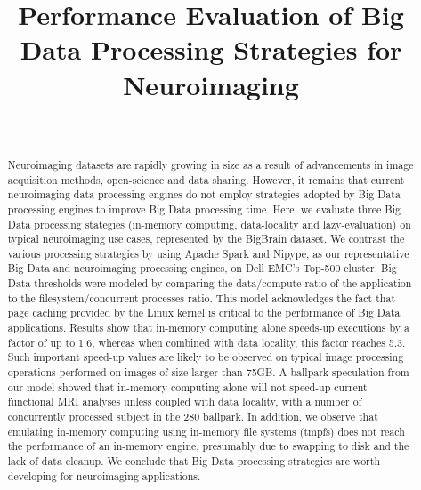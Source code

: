 \documentclass{IEEEtran}
\begin{document}
\title{Performance Evaluation of Big Data Processing Strategies for Neuroimaging}

\author{
  \\
}

\maketitle

\begin{abstract}
    Neuroimaging datasets are rapidly growing in size as a result of 
    advancements in image acquisition methods, open-science and data sharing. 
    However, it remains that current neuroimaging data processing engines do 
    not employ strategies adopted by Big Data processing engines to improve 
    Big Data processing time. Here, we 
    evaluate three Big Data processing stategies (in-memory computing, 
    data-locality and lazy-evaluation) on typical neuroimaging use 
    cases, represented by the BigBrain dataset. We contrast the various 
    processing strategies by using Apache Spark and Nipype, as our 
    representative Big Data and neuroimaging processing engines, on Dell EMC's 
    Top-500 cluster. 
    Big Data thresholds were modeled by comparing the data/compute ratio of the 
    application to the filesystem/concurrent processes ratio. 
    This model acknowledges the 
fact that page caching provided by the Linux kernel is critical to the 
performance of Big Data applications. Results show that in-memory 
computing alone speeds-up executions by a factor of up to 1.6, whereas 
when combined with data locality, this factor reaches 5.3. Such important 
speed-up values are likely to be observed on typical image processing 
operations performed on images of size larger than 75GB. A ballpark 
speculation from our model showed that in-memory computing alone will
not speed-up current 
functional MRI analyses unless coupled with data 
locality, with a number of concurrently processed subject in the  280 ballpark. 
    In addition, we observe that emulating in-memory computing 
using in-memory file systems (tmpfs) does not reach the performance of 
an in-memory engine, presumably due to swapping to disk and the lack of data cleanup.
We conclude that Big Data processing strategies are 
worth developing for neuroimaging 
applications. 
\end{abstract}
\end{document}
